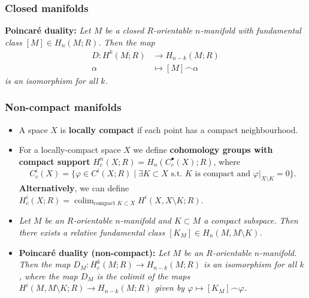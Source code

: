 \documentclass[10pt]{article}
\DeclareMathOperator*{\colim}{colim}
\begin{document}
            \subsubsection{Closed manifolds}

                \textbf{Poincaré duality:}
                \emph{Let $M$ be a closed $R$-orientable $n$-manifold with fundamental class $[M]\in H_n(M;R)$.}
                \emph{Then the map}
                \begin{align*}
                    D:H^k(M;R)&\to H_{n-k}(M;R)\\
                    \alpha&\mapsto[M]\smallfrown\alpha
                \end{align*}
                \emph{is an isomorphism for all $k$.}

            \subsubsection{Non-compact manifolds}

                \begin{itemize}
                    \item A space $X$ is \textbf{locally compact} if each point has a compact neighbourhood.
                    \item For a locally-compact space $X$ we define \textbf{cohomology groups with compact support} $H_c^n(X;R)=H_n(C_c^\bullet(X);R)$, where
                        \begin{equation*}
                            C_c^i(X)=\{\varphi\in C^i(X;R)\mid \exists K\subset X\text{ s.t. }K\text{ is compact and }\varphi|_{X\setminus K}=0\}.
                        \end{equation*}
                        \textbf{Alternatively}, we can define $H_c^i(X;R)=\colim_{\text{compact }K\subset X}H^i(X,X\setminus K;R)$.
                    \item \emph{Let $M$ be an $R$-orientable $n$-manifold and $K\subset M$ a compact subspace.}
                        \emph{Then there exists a relative fundamental class $[K_M]\in H_n(M,M\setminus K)$.}
                    \item \textbf{Poincaré duality (non-compact):}
                        \emph{Let $M$ be an $R$-orientable $n$-manifold.}
                        \emph{Then the map $D_M\colon H^k_c(M;R)\to H_{n-k}(M;R)$ is an isomorphism for all $k$, where the map $D_M$ is the colimit of the maps $H^i(M,M\setminus K;R)\to H_{n-k}(M;R)$ given by $\varphi\mapsto[K_M]\smallfrown\varphi$.}
                \end{itemize}
\end{document}
